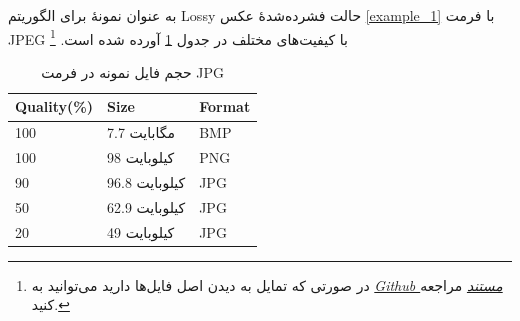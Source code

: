 به عنوان نمونهٔ برای الگوریتم Lossy 
حالت فشرده‌شدهٔ عکس 
\ref{example_1}
با فرمت JPEG 
با کیفیت‌های مختلف در جدول 
\ref{compare_2}
آورده شده است.
\footnote{در صورتی که تمایل به دیدن اصل فایل‌ها دارید می‌توانید به 
\textit{  \href{https://github.com/merfanian/DataCompressionDoc/tree/master/LatexFiles/figs}{Github مستند} 
} 
مراجعه کنید.
} 

\begin{table}[h]
	\centering
	\caption{حجم فایل نمونه در فرمت JPG}
	\label{compare_2}
	\begin{tabular}{@{}lll@{}}
	\toprule
	Quality(\%) & Size & Format \\ \midrule
	100 & 7.7 مگابایت & BMP \\
	100 & 98 کیلوبایت & PNG \\
	90 & 96.8 کیلوبایت & JPG \\
	50 & 62.9 کیلوبایت & JPG \\
	20 & 49  کیلوبایت& JPG \\ \bottomrule
	\end{tabular}
	\end{table}



